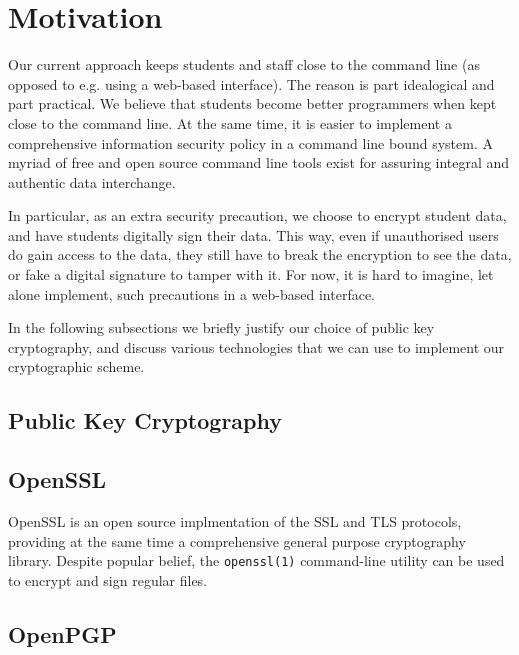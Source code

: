 
\section{Motivation}

Our current approach keeps students and staff close to the command line (as
opposed to e.g. using a web-based interface). The reason is part idealogical
and part practical. We believe that students become better programmers when
kept close to the command line. At the same time, it is easier to implement a
comprehensive information security policy in a command line bound system. A
myriad of free and open source command line tools exist for assuring integral
and authentic data interchange.

In particular, as an extra security precaution, we choose to encrypt student
data, and have students digitally sign their data. This way, even if
unauthorised users do gain access to the data, they still have to break the
encryption to see the data, or fake a digital signature to tamper with it.  For
now, it is hard to imagine, let alone implement, such precautions in a
web-based interface.

In the following subsections we briefly justify our choice of public key
cryptography, and discuss various technologies that we can use to implement our
cryptographic scheme.

\subsection{Public Key Cryptography}

\subsection{OpenSSL}

OpenSSL is an open source implmentation of the SSL and TLS protocols, providing
at the same time a comprehensive general purpose cryptography
library\cite{openssl-org-2014}. Despite popular belief, the \texttt{openssl(1)}
command-line utility can be used to encrypt and sign regular files.

\subsection{OpenPGP}
